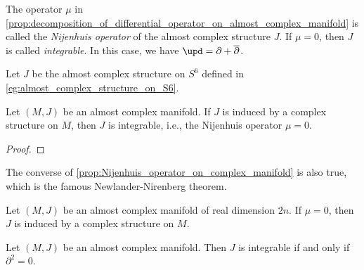     \begin{definition}\label{def:Nijenhuis_operator}
        The operator \(\mu\) in \cref{prop:decomposition_of_differential_operator_on_almost_complex_manifold} is called the \emph{Nijenhuis operator} of the almost complex structure \(J\).
        If \(\mu = 0\), then \(J\) is called \emph{integrable}.
        In this case, we have \(\upd = \partial + \overline{\partial}\).
    \end{definition}

    \begin{example}\label{eg:Nijenhuis_operator_on_S6_for_the_almost_complex_structure_on_S6_by_octonion}
        Let \(J\) be the almost complex structure on \(S^6\) defined in \cref{eg:almost_complex_structure_on_S6}.
        
    \end{example}

    \begin{proposition}\label{prop:Nijenhuis_operator_on_complex_manifold}
        Let \((M,J)\) be an almost complex manifold.
        If \(J\) is induced by a complex structure on \(M\), then \(J\) is integrable, i.e., the Nijenhuis operator \(\mu = 0\).
    \end{proposition}
    \begin{proof}
    \end{proof}

    The converse of \cref{prop:Nijenhuis_operator_on_complex_manifold} is also true, which is the famous Newlander-Nirenberg theorem.

    \begin{theorem}\label{thm:newlander_nirenberg_theorem}
        Let \((M,J)\) be an almost complex manifold of real dimension \(2n\).
        If \(\mu = 0\), then \(J\) is induced by a complex structure on \(M\).
    \end{theorem}

    \begin{proposition}\label{prop:integrable_almost_complex_structure_and_partial_square_zero}
        Let \((M,J)\) be an almost complex manifold.
        Then \(J\) is integrable if and only if \(\partial^2 = 0\).
    \end{proposition}



